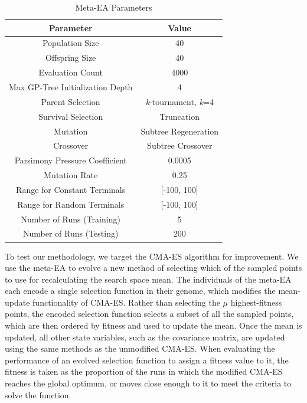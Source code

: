 \documentclass[sigconf]{acmart}
\begin{document}
\begin{table}
	\centering
	\caption{Meta-EA Parameters}
	\label{tab:Meta-EA Parameters}
	\begin{tabular}{c|c}
		\toprule
		Parameter& Value\\
		\midrule
		Population Size & 40 \\
		\hline
		Offspring Size & 40\\
		\hline
		Evaluation Count & 4000\\
		\hline
		Max GP-Tree Initialization Depth & 4\\
		\hline
		Parent Selection & \textit{k}-tournament, \textit{k}=4 \\
		\hline
		Survival Selection & Truncation\\
		\hline
		Mutation & Subtree Regeneration\\
		\hline
		Crossover & Subtree Crossover\\
		\hline
		Parsimony Pressure Coefficient & 0.0005\\
		\hline
		Mutation Rate & 0.25\\
		\hline
		Range for Constant Terminals & [-100, 100]\\
		\hline
		Range for Random Terminals & [-100, 100]\\
		\hline
		Number of Runs (Training) & 5 \\
		\hline
		Number of Runs (Testing) & 200\\
		
		\bottomrule
	\end{tabular}
\end{table}

To test our methodology, we target the CMA-ES algorithm for improvement. We use the meta-EA to evolve a new method of selecting which of the sampled points to use for recalculating the search space mean. The individuals of the meta-EA each encode a single selection function in their genome, which modifies the mean-update functionality of CMA-ES. Rather than selecting the $\mu$ highest-fitness points, the encoded selection function selects a subset of all the sampled points, which are then ordered by fitness and used to update the mean. Once the mean is updated, all other state variables, such as the covariance matrix, are updated using the same methods as the unmodified CMA-ES. When evaluating the performance of an evolved selection function to assign a fitness value to it, the fitness is taken as the proportion of the runs in which the modified CMA-ES reaches the global optimum, or moves close enough to it to meet the criteria to solve the function.
\end{document}
